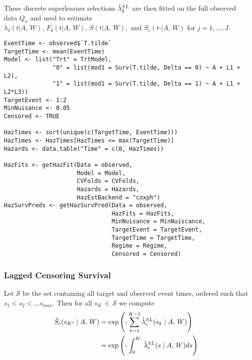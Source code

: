 \documentclass{report}
\newcommand{\1}{\ensuremath{\mathbf{1}}}
\newcommand{\AX}{\ensuremath{\mid A,\,{W}}}
\newcommand{\tK}{\ensuremath{K}}
\newcommand{\tKi}{\ensuremath{k}}
\begin{document}
These discrete superlearner selections \(\Hat{\lambda}_\delta^{SL}\) are then fitted on the full observed data \(Q_n\) and used to estimate \(\lambda_\delta(t \AX), \, F_\delta(t \AX),\, S(t \AX), \text{ and } S_c(t\text{-} \AX)\) for \(j = 1,\dots, J\).

\begin{lstlisting}
EventTime <- observed$`T.tilde`
TargetTime <- mean(EventTime)
Model <- list("Trt" = TrtModel,
              "0" = list(mod1 = Surv(T.tilde, Delta == 0) ~ A + L1 + L2),
              "1" = list(mod1 = Surv(T.tilde, Delta == 1) ~ A + L1 + L2*L3))
TargetEvent <- 1:2
MinNuisance <- 0.05
Censored <- TRUE

HazTimes <- sort(unique(c(TargetTime, EventTime)))
HazTimes <- HazTimes[HazTimes <= max(TargetTime)]
Hazards <- data.table("Time" = c(0, HazTimes))

HazFits <- getHazFit(Data = observed,
                     Model = Model,
                     CVFolds = CVFolds,
                     Hazards = Hazards,
                     HazEstBackend = "coxph")
HazSurvPreds <- getHazSurvPred(Data = observed,
                               HazFits = HazFits,
                               MinNuisance = MinNuiscance,
                               TargetEvent = TargetEvent,
                               TargetTime = TargetTime,
                               Regime = Regime,
                               Censored = Censored)
\end{lstlisting}

\subsubsection*{Lagged Censoring Survival}
\label{sec:orged766eb}
Let \(\mathcal{S}\) be the set containing all target and observed event times, ordered such that \(s_1 < s_2 < \dots s_{max}\). Then for all \(s_{\tK} \,\in\, \mathcal{S}\) we compute
\begin{align*}
\Hat{S}_c(s_{\tK}\text{-} \AX) &= \exp \left(\text{-} \sum_{\tKi = 1}^{\tK-1} \Hat{\lambda}_c^{SL}(s_{\tKi} \AX)\right) \\
&= \exp\left(\text{-} \int_{0}^{\tK\text{-}} \Hat\lambda^{SL}_c(s \AX) ds\right)\\
\end{align*}
\end{document}
